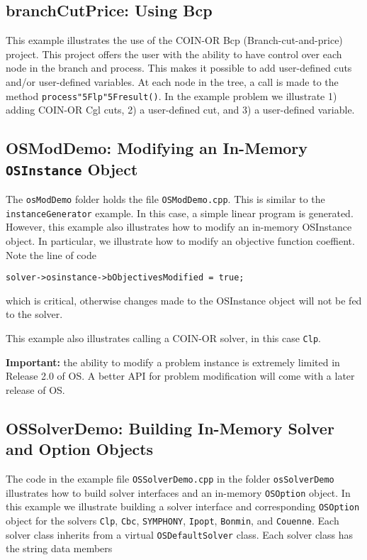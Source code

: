 \documentclass[11pt]{article}
\renewcommand{\_}{{\char"5F}}
\renewcommand{\{}{{\char"7B}}
\renewcommand{\}}{{\char"7D}}
\renewcommand{\^}{{\char"0D}}
\renewcommand{\'}{{\char"0D}}
\begin{document}
\subsection{branchCutPrice:  Using Bcp}\label{section:examplebranchCutPrice}

This example illustrates the use of the COIN-OR Bcp (Branch-cut-and-price) project.  This project offers the user with the ability to have control over each node in the branch and process. This makes it possible to add user-defined cuts and/or user-defined variables. At each node in the tree, a call is made to the method {\tt process\_lp\_result()}. In the example problem we illustrate 1) adding COIN-OR Cgl cuts, 2) a user-defined cut, and 3) a user-defined variable. 


\subsection{OSModDemo: Modifying an In-Memory {\tt OSInstance} Object}\label{section:exampleOSModDemo}

The {\tt osModDemo} folder holds the file {\tt OSModDemo.cpp}. This is similar to the {\tt instanceGenerator} example.
In this case, a simple linear program is generated. However, this example also illustrates how to modify an in-memory OSInstance object. In particular, we illustrate how to modify an objective function coeffient. Note the line of code 

\begin{verbatim}
solver->osinstance->bObjectivesModified = true;
\end{verbatim}
which is critical, otherwise changes made to the OSInstance object will not be fed to the solver. 

This example also illustrates calling a COIN-OR solver,
in this case {\tt Clp}.

\vskip 8pt

{\bf Important:} the ability to modify a problem instance is extremely limited in Release 2.0 of OS. A better API for problem modification will come with a later release of OS.



\subsection{OSSolverDemo: Building In-Memory Solver and Option Objects}\label{section:exampleOSSolverDemo}

The code in the  example file {\tt OSSolverDemo.cpp} in the folder {\tt osSolverDemo}  illustrates  how to build solver interfaces and  an in-memory {\tt OSOption} object. In this example we  illustrate building a solver interface and corresponding {\tt OSOption} object for the solvers {\tt Clp}, {\tt Cbc}, {\tt SYMPHONY}, {\tt Ipopt},   {\tt Bonmin}, and {\tt Couenne}.   Each solver class inherits from a virtual {\tt OSDefaultSolver} class. Each solver class has the string data members
\end{document}
